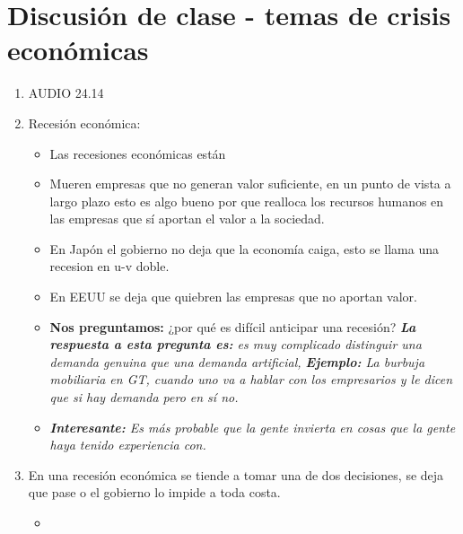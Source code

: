 \section{Discusión de clase - temas de crisis económicas}
\begin{enumerate}
    \item AUDIO 24.14
    \item Recesión económica: 
        \begin{itemize}
            \item Las recesiones económicas están 
            \item Mueren empresas que no generan valor suficiente, en un punto de vista a largo plazo esto es algo bueno por que realloca los recursos humanos en las empresas que sí aportan el valor a la sociedad. 
            \item En Japón el gobierno no deja que la economía caiga, esto se llama una recesion en u-v doble.
            \item En EEUU se deja que quiebren las empresas que no aportan valor.
            \item \textbf{Nos preguntamos:} ¿por qué es difícil anticipar una recesión? \emph{\textbf{La respuesta a esta pregunta es: }es muy complicado distinguir una demanda genuina que una demanda artificial, \emph{\textbf{Ejemplo: }La burbuja mobiliaria en GT, cuando uno va a hablar con los empresarios y le dicen que si hay demanda pero en sí no.}} 
            \item \emph{\textbf{Interesante:} Es más probable que la gente invierta en cosas que la gente haya tenido experiencia con.}
        \end{itemize}
    
    \item En una recesión económica se tiende a tomar una de dos decisiones, se deja que pase o el gobierno lo impide a toda costa.
        \begin{itemize}
            \item 
        \end{itemize}
\end{enumerate}


